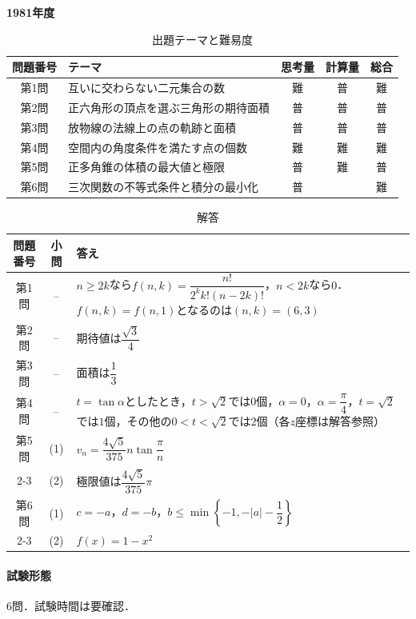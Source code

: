 \documentclass[../../main.tex]{subfiles}
\begin{document}
\begin{center}
  {\fontsize{48pt}{58pt}\selectfont \textbf{1981}\normalsize\textbf{年度}}
\end{center}

\begin{table}[htb]
  \centering
  \caption{出題テーマと難易度}
  \begin{tabular}{|c|p{6.2cm}|c|c|c|}
    \hline
    \textbf{問題番号} & \textbf{テーマ} & \textbf{思考量} & \textbf{計算量} & \textbf{総合} \\
    \hline
    第1問 & 互いに交わらない二元集合の数 & 難 & 普 & 難 \\
    \hline
    第2問 & 正六角形の頂点を選ぶ三角形の期待面積 & 普 & 普 & 普 \\
    \hline
    第3問 & 放物線の法線上の点の軌跡と面積 & 普 & 普 & 普 \\
    \hline
    第4問 & 空間内の角度条件を満たす点の個数 & 難 & 難 & 難 \\
    \hline
    第5問 & 正多角錐の体積の最大値と極限 & 普 & 難 & 普 \\
    \hline
    第6問 & 三次関数の不等式条件と積分の最小化 & 普 &  & 難 \\
    \hline
  \end{tabular}
\end{table}

\begin{table}[htb]
  \centering
  \caption{解答}
  \renewcommand{\arraystretch}{1.4}
  \begin{tabular}{|c|c|p{9cm}|}
    \hline
    \textbf{問題番号} & \textbf{小問} & \textbf{答え} \\
    \hline
    第1問 & -- & $n\ge2k$なら$f(n,k)=\dfrac{n!}{2^kk!(n-2k)!}$，$n<2k$なら$0$．$f(n,k)=f(n,1)$となるのは$(n,k)=(6,3)$ \\
    \hline
    第2問 & -- & 期待値は$\dfrac{\sqrt{3}}{4}$ \\
    \hline
    第3問 & -- & 面積は$\dfrac{1}{3}$ \\
    \hline
    第4問 & -- & $t=\tan\alpha$としたとき，$t>\sqrt{2}$では$0$個，$\alpha=0$，$\alpha=\dfrac{\pi}{4}$，$t=\sqrt{2}$では$1$個，その他の$0<t<\sqrt{2}$では$2$個（各$z$座標は解答参照） \\
    \hline
    第5問 & (1) & $v_n=\dfrac{4\sqrt{5}}{375}n\tan\dfrac{\pi}{n}$ \\
    \cline{2-3}
    & (2) & 極限値は$\dfrac{4\sqrt{5}}{375}\pi$ \\
    \hline
    第6問 & (1) & $c=-a$，$d=-b$，$b\le\min\left\{-1,-|a|-\dfrac{1}{2}\right\}$ \\
    \cline{2-3}
    & (2) & $f(x)=1-x^2$ \\
    \hline
  \end{tabular}
\end{table}

\paragraph{試験形態}
6問．試験時間は要確認．
\end{document}
